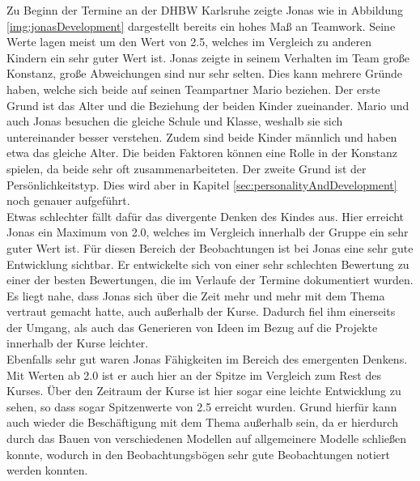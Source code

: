 Zu Beginn der Termine an der DHBW Karlsruhe zeigte Jonas wie in Abbildung \ref{img:jonasDevelopment} dargestellt bereits ein hohes Maß an Teamwork. Seine Werte lagen meist um den Wert von 2.5, welches im Vergleich zu anderen Kindern ein sehr guter Wert ist. Jonas zeigte in seinem Verhalten im Team große Konstanz, große Abweichungen sind nur sehr selten. Dies kann mehrere Gründe haben, welche sich beide auf seinen Teampartner Mario beziehen. Der erste Grund ist das Alter und die Beziehung der beiden Kinder zueinander. Mario und auch Jonas besuchen die gleiche Schule und Klasse, weshalb sie sich untereinander besser verstehen. Zudem sind beide Kinder männlich und haben etwa das gleiche Alter. Die beiden Faktoren können eine Rolle in der Konstanz spielen, da beide sehr oft zusammenarbeiteten. Der zweite Grund ist der Persönlichkeitstyp. Dies wird aber in Kapitel \ref{sec:personalityAndDevelopment} noch genauer aufgeführt.\\
Etwas schlechter fällt dafür das divergente Denken des Kindes aus. Hier erreicht Jonas ein Maximum von 2.0, welches im Vergleich innerhalb der Gruppe ein sehr guter Wert ist. Für diesen Bereich der Beobachtungen ist bei Jonas eine sehr gute Entwicklung sichtbar. Er entwickelte sich von einer sehr schlechten Bewertung zu einer der besten Bewertungen, die im Verlaufe der Termine dokumentiert wurden. Es liegt nahe, dass Jonas sich über die Zeit mehr und mehr mit dem Thema vertraut gemacht hatte, auch außerhalb der Kurse. Dadurch fiel ihm einerseits der Umgang, als auch das Generieren von Ideen im Bezug auf die Projekte innerhalb der Kurse leichter.\\
Ebenfalls sehr gut waren Jonas Fähigkeiten im Bereich des emergenten Denkens. Mit Werten ab 2.0 ist er auch hier an der Spitze im Vergleich zum Rest des Kurses. Über den Zeitraum der Kurse ist hier sogar eine leichte Entwicklung zu sehen, so dass sogar Spitzenwerte von 2.5 erreicht wurden. Grund hierfür kann auch wieder die Beschäftigung mit dem Thema außerhalb sein, da er hierdurch durch das Bauen von verschiedenen Modellen auf allgemeinere Modelle  schließen konnte, wodurch in den Beobachtungsbögen sehr gute Beobachtungen notiert werden konnten.\\
